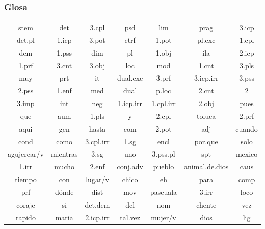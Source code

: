 \documentclass[letterpaper,12pt,oneside]{book}
\begin{document}
\subsubsection{Glosa}

\begin{center}
	\begin{tabular}{| c | c | c | c | c | c | c |}
		\hline
			stem & det & 3.cpl & psd & lim & prag & 3.icp \\

			det.pl & 1.icp & 3.pot & ctrf & 1.pot & pl.exc & 1.cpl \\

			dem & 1.pss & dim & pl & 1.obj & ila & 2.icp \\

			1.prf & 3.cnt & 3.obj & loc & mod & 1.cnt & 3.pls \\

			muy & prt & it & dual.exc & 3.prf & 3.icp.irr & 3.pss \\

			2.pss & 1.enf & med & dual & p.loc & 2.cnt & 2 \\

			3.imp & int & neg & 1.icp.irr & 1.cpl.irr & 2.obj & pues \\

			que & aum & 1.pls & y & 2.cpl & toluca & 2.prf \\

			aqui & gen & hasta & com & 2.pot & adj & cuando \\

			cond & como & 3.cpl.irr & 1.sg & encl & por.que & solo \\

			agujerear/v & mientras & 3.sg & uno & 3.pss.pl & spt & mexico \\

			1.irr & mucho & 2.enf & conj.adv & pueblo & animal.de.dios & caus \\

			tiempo & con & lugar/v & chico & eh & para & comp \\

			prf & dónde & dist & mov & pascuala & 3.irr & loco \\

			coraje & si & det.dem & dcl & nom & chente & vez \\

			rapido & maria & 2.icp.irr & tal.vez & mujer/v & dios & lig \\
		\hline
	\end{tabular}
\end{center}
\end{document}
